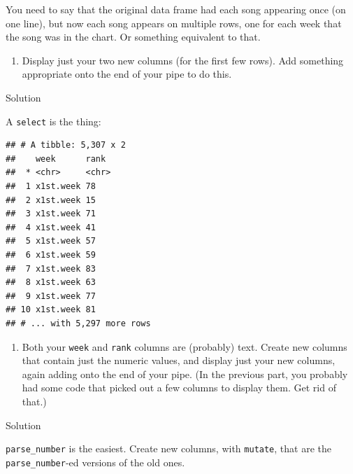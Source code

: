 \documentclass[]{tufte-book}
\newenvironment{Shaded}{}{}
\newcommand{\DataTypeTok}[1]{\textcolor[rgb]{0.56,0.13,0.00}{#1}}
\newcommand{\KeywordTok}[1]{\textcolor[rgb]{0.00,0.44,0.13}{\textbf{#1}}}
\newcommand{\NormalTok}[1]{#1}
\newcommand{\OperatorTok}[1]{\textcolor[rgb]{0.40,0.40,0.40}{#1}}
\newcommand{\StringTok}[1]{\textcolor[rgb]{0.25,0.44,0.63}{#1}}
\providecommand{\tightlist}{%
  \setlength{\itemsep}{0pt}\setlength{\parskip}{0pt}}
\theoremstyle{definition}
\theoremstyle{definition}
\theoremstyle{definition}
\theoremstyle{remark}
\begin{document}
You need to say that the original data frame had each song appearing
once (on one line), but now each song appears on multiple rows, one for
each week that the song was in the chart. Or something equivalent to
that.

\begin{enumerate}
\def\labelenumi{(\alph{enumi})}
\setcounter{enumi}{2}
\tightlist
\item
  Display just your two new columns (for the first few rows). Add
  something appropriate onto the end of your pipe to do this.
\end{enumerate}

Solution

A \texttt{select} is the thing:

\begin{Shaded}
\end{Shaded}

\begin{verbatim}
## # A tibble: 5,307 x 2
##    week      rank 
##  * <chr>     <chr>
##  1 x1st.week 78   
##  2 x1st.week 15   
##  3 x1st.week 71   
##  4 x1st.week 41   
##  5 x1st.week 57   
##  6 x1st.week 59   
##  7 x1st.week 83   
##  8 x1st.week 63   
##  9 x1st.week 77   
## 10 x1st.week 81   
## # ... with 5,297 more rows
\end{verbatim}

\begin{enumerate}
\def\labelenumi{(\alph{enumi})}
\setcounter{enumi}{3}
\tightlist
\item
  Both your \texttt{week} and \texttt{rank} columns are (probably) text.
  Create new columns that contain just the numeric values, and display
  just your new columns, again adding onto the end of your pipe. (In the
  previous part, you probably had some code that picked out a few
  columns to display them. Get rid of that.)
\end{enumerate}

Solution

\texttt{parse\_number} is the easiest. Create new columns, with
\texttt{mutate}, that are the \texttt{parse\_number}-ed versions of the
old ones.
\end{document}
